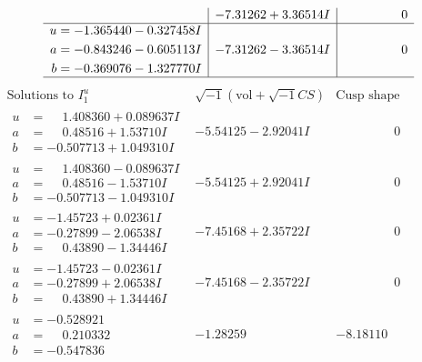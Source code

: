 \documentclass[1p]{elsarticle_modified}
\theoremstyle{definition}
\newcommand{\I}{\sqrt{-1}}
\begin{document}
$$\begin{array}{c|c|c}
 & -7.31262 + 3.36514 I & \phantom{-0.000000 } 0 \\ \hline\begin{aligned}
u &= -1.365440 - 0.327458 I \\
a &= -0.843246 - 0.605113 I \\
b &= -0.369076 - 1.327770 I\end{aligned}
 & -7.31262 - 3.36514 I & \phantom{-0.000000 } 0\\
 \hline 
 \end{array}$$\newpage$$\begin{array}{c|c|c}  
\text{Solutions to }I^u_{1}& \I (\text{vol} + \sqrt{-1}CS) & \text{Cusp shape}\\
 \hline 
\begin{aligned}
u &= \phantom{-}1.408360 + 0.089637 I \\
a &= \phantom{-}0.48516 + 1.53710 I \\
b &= -0.507713 + 1.049310 I\end{aligned}
 & -5.54125 - 2.92041 I & \phantom{-0.000000 } 0 \\ \hline\begin{aligned}
u &= \phantom{-}1.408360 - 0.089637 I \\
a &= \phantom{-}0.48516 - 1.53710 I \\
b &= -0.507713 - 1.049310 I\end{aligned}
 & -5.54125 + 2.92041 I & \phantom{-0.000000 } 0 \\ \hline\begin{aligned}
u &= -1.45723 + 0.02361 I \\
a &= -0.27899 - 2.06538 I \\
b &= \phantom{-}0.43890 - 1.34446 I\end{aligned}
 & -7.45168 + 2.35722 I & \phantom{-0.000000 } 0 \\ \hline\begin{aligned}
u &= -1.45723 - 0.02361 I \\
a &= -0.27899 + 2.06538 I \\
b &= \phantom{-}0.43890 + 1.34446 I\end{aligned}
 & -7.45168 - 2.35722 I & \phantom{-0.000000 } 0 \\ \hline\begin{aligned}
u &= -0.528921\phantom{ +0.000000I} \\
a &= \phantom{-}0.210332\phantom{ +0.000000I} \\
b &= -0.547836\phantom{ +0.000000I}\end{aligned}
 & -1.28259\phantom{ +0.000000I} & -8.18110\phantom{ +0.000000I} \\ \hline\begin{aligned}

\end{aligned}
\end{array}$$
\end{document}

